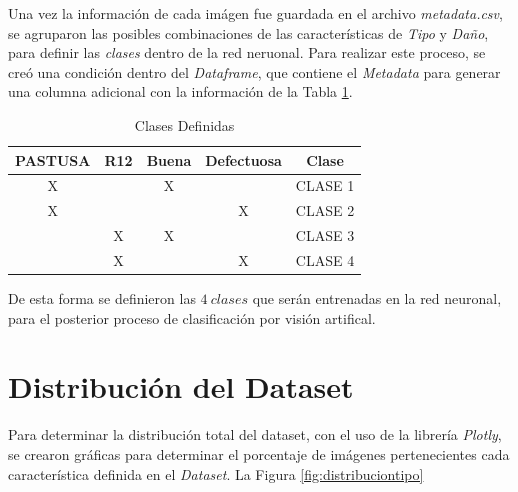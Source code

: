 	Una vez la información de cada imágen fue guardada en el archivo \textit{metadata.csv}, se agruparon las posibles combinaciones de las características de \textit{Tipo} y \textit{Daño}, para definir las \textit{clases} dentro de la red neruonal. Para realizar este proceso, se creó una condición dentro del \textit{Dataframe}, que contiene el \textit{Metadata} para generar una columna adicional con la información de la Tabla \ref{table:Clases}.	
	
	\begin{table}[ht]
		\centering
		\begin{tabular}{|c|c|c|c|c|}
			\hline
			PASTUSA & R12 & Buena & Defectuosa & Clase \\
			\hline
			X &  & X &  & CLASE 1 \\
			\hline
			X &  &  & X & CLASE 2 \\
			\hline
			& X & X &  & CLASE 3 \\
			\hline
			& X &  & X & CLASE 4 \\
			\hline
		\end{tabular}	
		\caption{Clases Definidas}
		\label{table:Clases}
	\end{table}	

De esta forma se definieron las $4 \ clases$ que serán entrenadas en la red neuronal, para el posterior proceso de clasificación por visión artifical. 


\newpage
\section{Distribución del Dataset}
	  
	Para determinar la distribución total del dataset, con el uso de la librería \textit{Plotly}, se crearon gráficas para determinar el porcentaje de imágenes pertenecientes cada característica definida en el \textit{Dataset}. La Figura \ref{fig:distribuciontipo}
		

